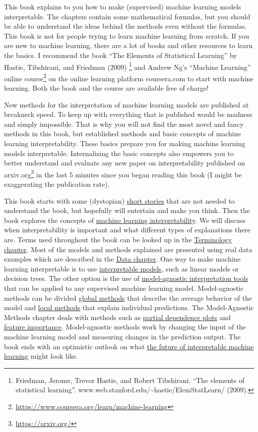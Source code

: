 \documentclass[12pt,]{krantz}
\renewcommand{\href}[2]{#2\footnote{\url{#1}}}
\begin{document}
This book explains to you how to make (supervised) machine learning
models interpretable. The chapters contain some mathematical formulas,
but you should be able to understand the ideas behind the methods even
without the formulas. This book is not for people trying to learn
machine learning from scratch. If you are new to machine learning, there
are a lot of books and other resources to learn the basics. I recommend
the book ``The Elements of Statistical Learning'' by Hastie, Tibshirani,
and Friedman (2009) \footnote{Friedman, Jerome, Trevor Hastie, and
  Robert Tibshirani. ``The elements of statistical learning''.
  www.web.stanford.edu/\textasciitilde{}hastie/ElemStatLearn/ (2009).}
and \href{https://www.coursera.org/learn/machine-learning}{Andrew Ng's
``Machine Learning'' online course} on the online learning platform
coursera.com to start with machine learning. Both the book and the
course are available free of charge!

New methods for the interpretation of machine learning models are
published at breakneck speed. To keep up with everything that is
published would be madness and simply impossible. That is why you will
not find the most novel and fancy methods in this book, but established
methods and basic concepts of machine learning interpretability. These
basics prepare you for making machine learning models interpretable.
Internalizing the basic concepts also empowers you to better understand
and evaluate any new paper on interpretability published on
\href{https://arxiv.org/}{arxiv.org} in the last 5 minutes since you
began reading this book (I might be exaggerating the publication rate).

This book starts with some (dystopian)
\protect\hyperlink{storytime}{short stories} that are not needed to
understand the book, but hopefully will entertain and make you think.
Then the book explores the concepts of
\protect\hyperlink{interpretability}{machine learning interpretability}.
We will discuss when interpretability is important and what different
types of explanations there are. Terms used throughout the book can be
looked up in the \protect\hyperlink{terminology}{Terminology chapter}.
Most of the models and methods explained are presented using real data
examples which are described in the \protect\hyperlink{data}{Data
chapter}. One way to make machine learning interpretable is to use
\protect\hyperlink{simple}{interpretable models}, such as linear models
or decision trees. The other option is the use of
\protect\hyperlink{agnostic}{model-agnostic interpretation tools} that
can be applied to any supervised machine learning model. Model-agnostic
methods can be divided \protect\hyperlink{global-methods}{global
methods} that describe the average behavior of the model and
\protect\hyperlink{local-methods}{local methods} that explain individual
predictions. The Model-Agnostic Methods chapter deals with methods such
as \protect\hyperlink{pdp}{partial dependence plots} and
\protect\hyperlink{feature-importance}{feature importance}.
Model-agnostic methods work by changing the input of the machine
learning model and measuring changes in the prediction output. The book
ends with an optimistic outlook on what \protect\hyperlink{future}{the
future of interpretable machine learning} might look like.
\end{document}
